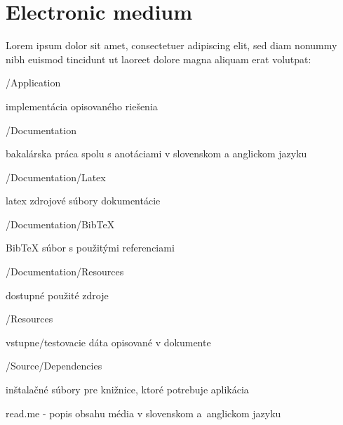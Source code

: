
\chapter{Electronic medium}
Lorem ipsum dolor sit amet, consectetuer adipiscing elit, sed diam nonummy nibh euismod tincidunt ut laoreet dolore magna aliquam erat volutpat:
\begin{my_itemize}
\emptyitem /Application
	\begin{my_itemize}
	\myitem implementácia opisovaného riešenia
	\end{my_itemize}	
\emptyitem /Documentation
	\begin{my_itemize}
	\myitem bakalárska práca spolu s anotáciami v slovenskom a anglickom jazyku
	\end{my_itemize}
\emptyitem /Documentation/Latex
	\begin{my_itemize}
	\myitem latex zdrojové súbory dokumentácie
	\end{my_itemize}
\emptyitem /Documentation/BibTeX
	\begin{my_itemize}
	\myitem BibTeX súbor s použitými referenciami
	\end{my_itemize}
\emptyitem /Documentation/Resources
	\begin{my_itemize}
	\myitem dostupné použité zdroje
	\end{my_itemize}
\emptyitem /Resources
	\begin{my_itemize}
	\myitem vstupne/testovacie dáta opisované v dokumente
	\end{my_itemize}
\emptyitem /Source/Dependencies
	\begin{my_itemize}
	\myitem inštalačné súbory pre knižnice, ktoré potrebuje aplikácia
	\end{my_itemize}	
\emptyitem read.me	- popis obsahu média v slovenskom a~anglickom jazyku
\end{my_itemize}